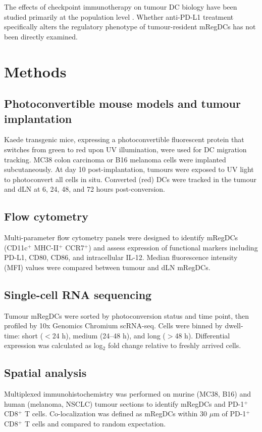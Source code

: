 \documentclass[11pt]{article}
\begin{document}
The effects of checkpoint immunotherapy on tumour DC biology have been studied primarily at the population level \citep{garris2018successful}. Whether anti-PD-L1 treatment specifically alters the regulatory phenotype of tumour-resident mRegDCs has not been directly examined.

\section{Methods}

\subsection{Photoconvertible mouse models and tumour implantation}
Kaede transgenic mice, expressing a photoconvertible fluorescent protein that switches from green to red upon UV illumination, were used for DC migration tracking. MC38 colon carcinoma or B16 melanoma cells were implanted subcutaneously. At day 10 post-implantation, tumours were exposed to UV light to photoconvert all cells in situ. Converted (red) DCs were tracked in the tumour and dLN at 6, 24, 48, and 72 hours post-conversion.

\subsection{Flow cytometry}
Multi-parameter flow cytometry panels were designed to identify mRegDCs (CD11c$^+$ MHC-II$^+$ CCR7$^+$) and assess expression of functional markers including PD-L1, CD80, CD86, and intracellular IL-12. Median fluorescence intensity (MFI) values were compared between tumour and dLN mRegDCs.

\subsection{Single-cell RNA sequencing}
Tumour mRegDCs were sorted by photoconversion status and time point, then profiled by 10x Genomics Chromium scRNA-seq. Cells were binned by dwell-time: short ($<$24 h), medium (24--48 h), and long ($>$48 h). Differential expression was calculated as log$_2$ fold change relative to freshly arrived cells.

\subsection{Spatial analysis}
Multiplexed immunohistochemistry was performed on murine (MC38, B16) and human (melanoma, NSCLC) tumour sections to identify mRegDCs and PD-1$^+$CD8$^+$ T cells. Co-localization was defined as mRegDCs within 30 $\mu$m of PD-1$^+$CD8$^+$ T cells and compared to random expectation.
\end{document}

